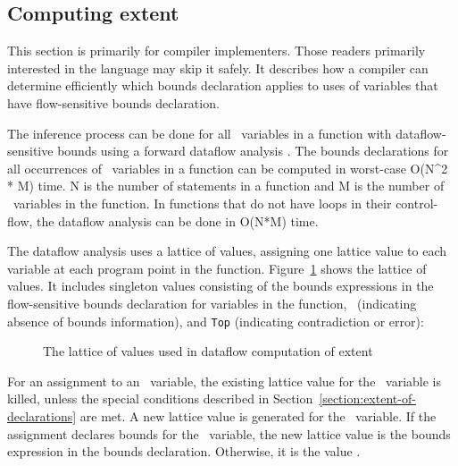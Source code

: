 \subsection{Computing extent}
\label{section:computing-extent}

This section is primarily for compiler implementers. Those readers
primarily interested in the language may skip it safely. It describes
how a compiler can determine efficiently which bounds declaration
applies to uses of variables that have flow-sensitive bounds
declaration.

The inference process can be done for all \arrayptr\ variables
in a function with dataflow-sensitive bounds using a forward dataflow
analysis \cite{Aho2007}. The bounds declarations for all occurrences of
\arrayptr\ variables in a function can be computed in
worst-case O(N\^{}2 * M) time. N is the number of statements in a
function and M is the number of \arrayptr\ variables in the
function. In functions that do not have loops in their control-flow, the
dataflow analysis can be done in O(N*M) time.

The dataflow analysis uses a lattice of values, assigning one lattice
value to each variable at each program point in the function.  
Figure~\ref{fig:extent-dataflow-lattice} shows the lattice of values.  
It includes singleton values consisting of the bounds
expressions in the flow-sensitive bounds declaration for variables in
the function, \boundsnone\ (indicating absence of bounds
information), and \texttt{Top} (indicating contradiction or error):

\begin{figure}
\begin{center}
\end{center}
\caption{The lattice of values used in dataflow computation of extent}
\label{fig:extent-dataflow-lattice}
\end{figure}
 
For an assignment to an \arrayptr\ variable, the existing
lattice value for the \arrayptr\ variable is killed, unless
the special conditions described in Section~\ref{section:extent-of-declarations}
are met. 
A new lattice value is generated for the \arrayptr\ variable. If the
assignment declares bounds for the \arrayptr\ variable, the new
lattice value is the bounds expression in the bounds declaration.
Otherwise, it is the value \boundsnone.

